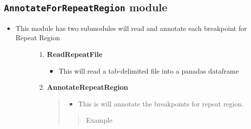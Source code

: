 \documentclass[letterpaper,10pt,english]{sphinxmanual}
\begin{document}
\subsection{\texttt{AnnotateForRepeatRegion} module}
\label{iAnnotateSV:annotateforrepeatregion-module}\begin{itemize}
\item {} \begin{description}
\item[{This module has two submodules will read and annotate each breakpoint for Repeat Region}] \leavevmode\begin{enumerate}
\item {} 
\textbf{ReadRepeatFile}
\begin{itemize}
\item {} 
This will read a tab-delimited file into a panadas dataframe

\end{itemize}

\item {} 
\textbf{AnnotateRepeatRegion}
\begin{quote}
\begin{itemize}
\item {} 
This is will annotate the breakpoints for repeat region.

\end{itemize}
\begin{quote}\begin{description}
\item[{Example}] \leavevmode
{}

\end{description}\end{quote}
\end{quote}

\end{enumerate}

\end{description}

\end{itemize}
\end{document}
